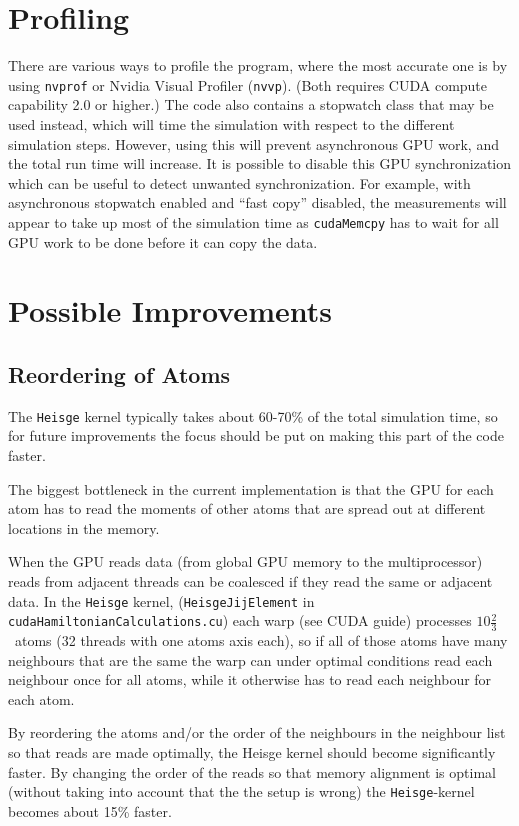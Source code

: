 \documentclass{article}
\begin{document}
\section{Profiling}

There are various ways to profile the program, where the most accurate one 
is by using \verb|nvprof| or Nvidia Visual Profiler (\verb|nvvp|). (Both 
requires CUDA compute capability 2.0 or higher.) The code also contains a 
stopwatch class that may be used instead, which will time the simulation with 
respect to the different simulation steps. However, using this will prevent 
asynchronous GPU work, and the total run time will increase. It is possible 
to disable this GPU synchronization which can be useful to detect unwanted 
synchronization. For example, with asynchronous stopwatch enabled and 
``fast copy'' disabled, the measurements will appear to take up most of the 
simulation time as \verb|cudaMemcpy| has to wait for all GPU work to be done 
before it can copy the data.


\section{Possible Improvements}

\subsection{Reordering of Atoms}
The \verb|Heisge| kernel typically takes about 60-70\% of the total 
simulation time, so for future improvements the focus should be put on 
making this part of the code faster.

The biggest bottleneck in the current implementation is that the GPU for each 
atom has to read the moments of other atoms that are spread out at different 
locations in the memory.

When the GPU reads data (from global GPU memory to the multiprocessor) 
reads from adjacent threads can be coalesced if they read the same or adjacent 
data. In the \verb|Heisge| kernel, (\verb|HeisgeJijElement| in 
\verb|cudaHamiltonianCalculations.cu|) each warp (see CUDA guide) processes 
$10\frac{2}{3}$~atoms (32 threads with one atoms axis each), so if all of those atoms 
have many neighbours that are the same the warp can under optimal conditions 
read each neighbour once for all atoms, while it otherwise has to read each 
neighbour for each atom.

By reordering the atoms and/or the order of the neighbours in the neighbour 
list so that reads are made optimally, the Heisge kernel should become 
significantly faster. By changing the order of the reads so that memory 
alignment is optimal (without taking into account that the the setup is 
wrong) the \verb|Heisge|-kernel becomes about 15\% faster.
\end{document}
